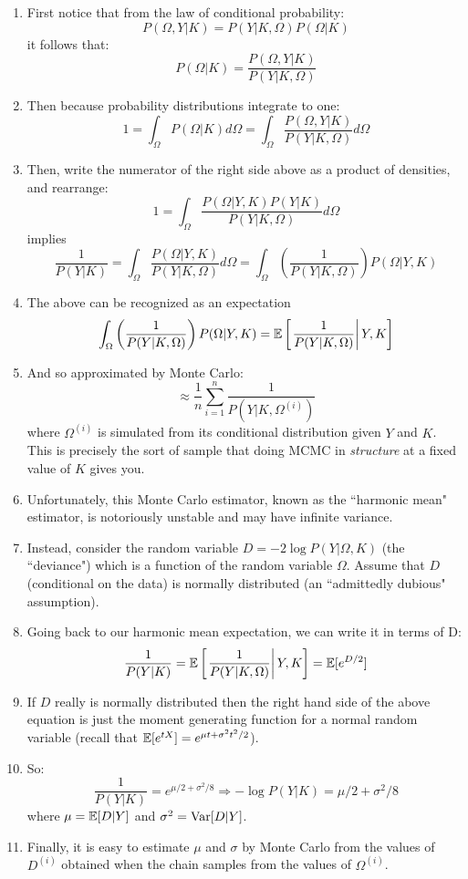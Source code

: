 \begin{enumerate}
\item First notice that from the law of conditional probability:
\[
	P(\Omega,Y|K) = P(Y|K,\Omega)P(\Omega|K)
\]
it follows that:
\[
	P(\Omega|K) = \frac{P(\Omega,Y|K)}{P(Y|K,\Omega)}
\]
\item Then because probability distributions integrate to one:
\[
	1 = \int_\Omega P(\Omega|K)d\Omega = \int_\Omega \frac{P(\Omega,Y|K)}{P(Y|K,\Omega)} d\Omega
\]
\newpage
\item Then, write the numerator of the right side above as a product of densities, and rearrange:
\[
	1 = \int_\Omega \frac{P(\Omega|Y,K)P(Y|K)}{P(Y|K,\Omega)} d\Omega 
\]
implies
\[
	\frac{1}{P(Y|K)} = \int_\Omega \frac{P(\Omega|Y,K)}{P(Y|K,\Omega)} d\Omega =
	\int_\Omega \left(\frac{1}{P(Y|K,\Omega)}\right) P(\Omega|Y,K)
\]
\item The above can be recognized as an expectation
\[
	\int_\Omega \left(\frac{1}{P(Y|K,\Omega)}\right) P(\Omega|Y,K) = \Bbb{E}\left[\left.
	\frac{1}{P(Y|K,\Omega)}\right| Y,K\right]
\]
\item And so approximated by Monte Carlo:
\[
\approx \frac{1}{n}\sum_{i=1}^n \frac{1}{P(Y|K,\Omega^{(i)})}
\]
where $\Omega^{(i)}$ is simulated from its conditional distribution given $Y$ and $K$.  This is precisely the sort of sample that doing MCMC in {\em structure} at a fixed value of $K$ gives you.   
\item Unfortunately, this Monte Carlo estimator, known as the ``harmonic mean" estimator, is notoriously unstable and may have infinite variance.
\item Instead, consider the random variable $D = -2\log P(Y|\Omega,K)$ (the ``deviance") which is a function of the random variable $\Omega$.  Assume that $D$ (conditional on the data) is normally distributed (an ``admittedly dubious" assumption).
\item Going back to our harmonic mean expectation, we can write it in terms of D:
\[
	\frac{1}{P(Y|K)} = \Bbb{E}\left[\left.
	\frac{1}{P(Y|K,\Omega)}\right| Y,K\right] = 
	\Bbb{E}[e^{D/2}]
\]
\item If $D$ really is normally distributed then the right hand side of the above equation is just the moment generating function for a normal random variable (recall that $\Bbb{E}[e^{tX}] = e^{\mu t + \sigma^2 t^2/2}$).
\item So:
\[
	\frac{1}{P(Y|K)} = e^{\mu/2 + \sigma^2/8} \Rightarrow -\log P(Y|K) = \mu/2 + \sigma^2/8
\] 
where $\mu=\Bbb{E}[D|Y]$ and $\sigma^2 = {\mathrm{Var}}[D|Y]$.
\item Finally, it is easy to estimate $\mu$ and $\sigma$ by Monte Carlo from the values of $D^{(i)}$ obtained when the chain samples from the values of $\Omega^{(i)}$. 
\end{enumerate}


